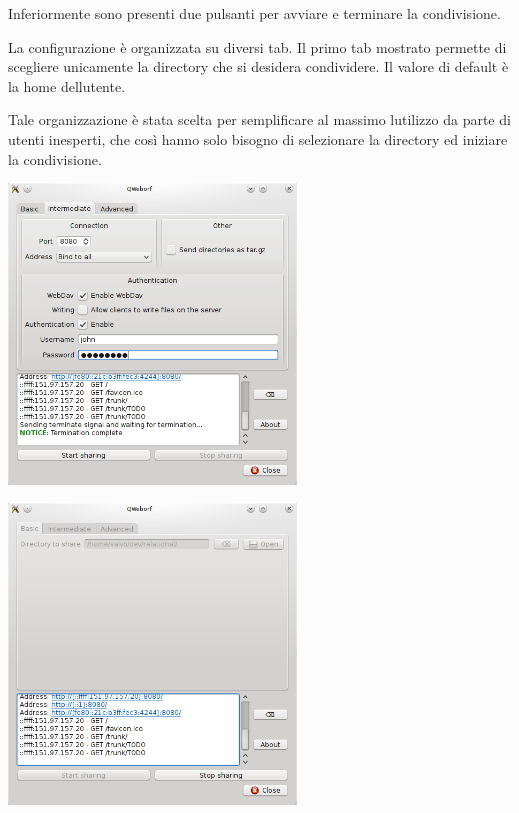 \documentclass[a4paper,11pt]{article}
\makeatletter
\newcommand\captionof[1]{\def\@captype{#1}\caption}
\makeatother
\begin{document}
{\sffamily
Inferiormente sono presenti due pulsanti per avviare e terminare la
condivisione.}

{\sffamily
La configurazione \`e organizzata su diversi tab. Il primo tab mostrato
permette di scegliere unicamente la directory che si desidera
condividere. Il valore di default \`e la home
dell{\textquotesingle}utente.}

{\sffamily
Tale organizzazione \`e stata scelta per semplificare al massimo
l{\textquotesingle}utilizzo da parte di utenti inesperti, che cos\`i
hanno solo bisogno di selezionare la directory ed iniziare la
condivisione.}

{\sffamily
\begin{minipage}{7.655cm}
\includegraphics[width=7.655cm,height=7.98cm]{tesi-img1.png}
\captionof{figure}{qweborf, interfaccia di configurazione per utenti
avanzati}
\end{minipage} \begin{minipage}{7.655cm}
\includegraphics[width=7.655cm,height=7.98cm]{tesi-img2.png}
\captionof{figure}{qweborf, interfaccia semplice}
\end{minipage}}
\end{document}
